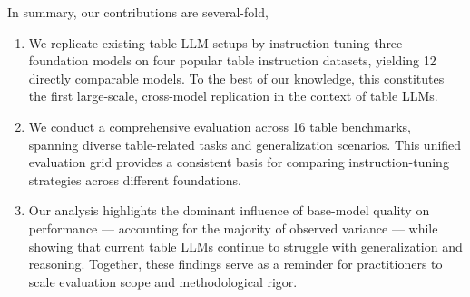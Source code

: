 \documentclass[11pt]{article}
\begin{document}
In summary, our contributions are several-fold,
\begin{enumerate}[leftmargin=\parindent,align=left,labelwidth=\parindent,labelsep=0pt]
\item We replicate existing table-LLM setups by instruction-tuning three foundation models on four popular table instruction datasets, yielding 12 directly comparable models.
To the best of our knowledge, this constitutes the first large-scale, cross-model replication in the context of table LLMs.
\item We conduct a comprehensive evaluation across 16 table benchmarks, spanning diverse table-related tasks and generalization scenarios.
This unified evaluation grid provides a consistent basis for comparing instruction-tuning strategies across different foundations.
\item Our analysis highlights the dominant influence of base-model quality on performance — accounting for the majority of observed variance — while showing that current table LLMs continue to struggle with generalization and reasoning.
Together, these findings serve as a reminder for practitioners to scale evaluation scope and methodological rigor.
\end{enumerate}

\end{document}

